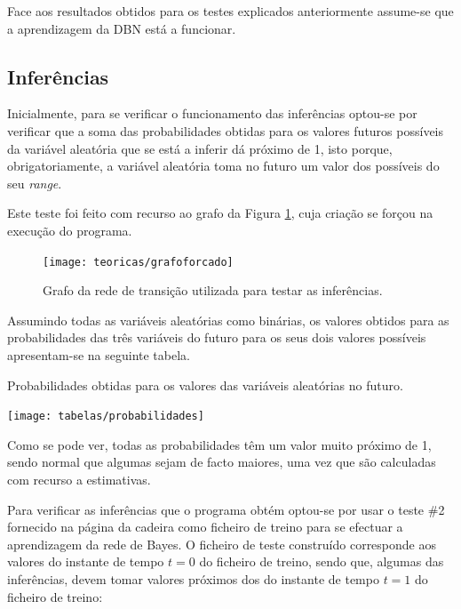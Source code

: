 \documentclass[10pt]{article}
\numberwithin{equation}{section}
\begin{document}
Face aos resultados obtidos para os testes explicados anteriormente assume-se que a aprendizagem da DBN está a funcionar.

\subsection{Inferências}

Inicialmente, para se verificar o funcionamento das inferências optou-se por verificar que a soma das probabilidades obtidas para os valores futuros possíveis da variável aleatória que se está a inferir dá próximo de 1, isto porque, obrigatoriamente, a variável aleatória toma no futuro um valor dos possíveis do seu \textit{range}. 

Este teste foi feito com recurso ao grafo da Figura \ref{fig:grafoforcado}, cuja criação se forçou na execução do programa.

\begin{figure}[H]
	\centering
	\texttt{[image: teoricas/grafoforcado]}
	\caption{Grafo da rede de transição utilizada para testar as inferências.}
	\vspace{-0.8em}
	\label{fig:grafoforcado}
\end{figure}

Assumindo todas as variáveis aleatórias como binárias, os valores obtidos para as probabilidades das três variáveis do futuro para os seus dois valores possíveis apresentam-se na seguinte tabela.

\begin{table}[H]
	\centering
	\caption{Probabilidades obtidas para os valores das variáveis aleatórias no futuro.}
	\vspace{-1.5mm}
	\texttt{[image: tabelas/probabilidades]}
\end{table}

\vspace{-1.5mm}
Como se pode ver, todas as probabilidades têm um valor muito próximo de 1, sendo normal que algumas sejam de facto maiores, uma vez que são calculadas com recurso a estimativas.

Para verificar as inferências que o programa obtém optou-se por usar o teste \#2 fornecido na página da cadeira como ficheiro de treino para se efectuar a aprendizagem da rede de Bayes. O ficheiro de teste construído corresponde aos valores do instante de tempo $t = 0$ do ficheiro de treino, sendo que, algumas das inferências, devem tomar valores próximos dos do instante de tempo $t = 1$ do ficheiro de treino:
\end{document}
